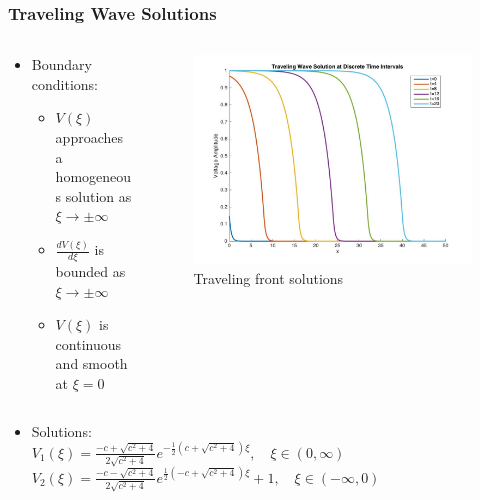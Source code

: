 \documentclass{beamer}
\begin{document}
\begin{frame}
\frametitle{Traveling Wave Solutions}
\begin{columns}
\begin{column}{.4\textwidth}
\begin{itemize}
	\item Boundary conditions:
		\begin{itemize}
			\item $V(\xi)$ approaches a homogeneous solution as $\xi \rightarrow\pm\infty$
			\item $\frac{d V(\xi)}{d\xi}$ is bounded as $\xi\rightarrow\pm\infty$
			\item $V(\xi)$ is continuous and smooth at $\xi=0$
		\end{itemize}
\end{itemize}
\end{column}

\begin{column}{.51\textwidth}
\begin{figure}
\includegraphics[scale=0.15]{travelingWaves1}
\caption{Traveling front solutions}
\end{figure}
\end{column}
\end{columns}

\begin{itemize}
	\item Solutions: \\$V_1(\xi)=\frac{-c+\sqrt{c^2+4}}{2\sqrt{c^2+4}}e^{-\frac{1}{2}(c+\sqrt{c^2+4})\xi},\quad \xi \in (0,\infty)$\\$V_2(\xi)=\frac{-c-\sqrt{c^2+4}}{2\sqrt{c^2+4}}e^{\frac{1}{2}(-c+\sqrt{c^2+4})\xi}+1,\quad \xi \in (-\infty,0)$
\end{itemize}
\end{frame}
\end{document}
